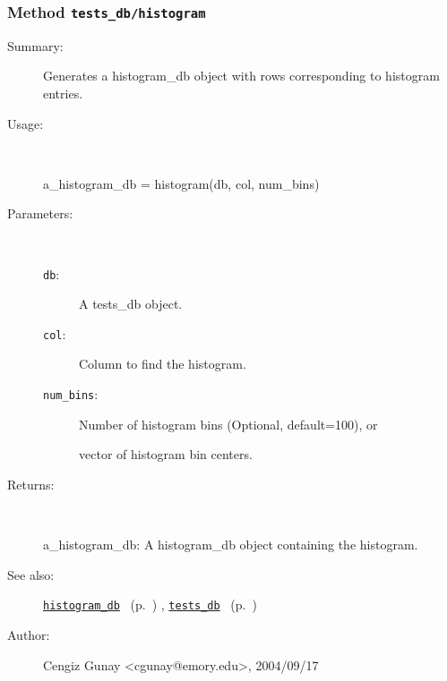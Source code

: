 \subsubsection[Method \texttt{histogram}]{Method \texttt{tests\_db/histogram}}%
%
\label{ref_tests_db__histogram}%
\hypertarget{ref_tests_db__histogram}{}%
\begin{description}
\item[Summary:]Generates a histogram\_db object with rows corresponding to 
		histogram entries.
%
\item[Usage:]~%
\begin{lyxcode}%
a\_histogram\_db = histogram(db, col, num\_bins)
%
\end{lyxcode}%
%
%
\item[Parameters:]~
\begin{description}%
\item[\texttt{db}:]
 A tests\_db object.
\item[\texttt{col}:]
 Column to find the histogram.
\item[\texttt{num\_bins}:]
 Number of histogram bins (Optional, default=100), or

vector of histogram bin centers.\end{description}%
%
\item[Returns:]~

	a\_histogram\_db: A histogram\_db object containing the histogram.
%
%
\item[See also:]%
\hyperlink{ref_histogram_db}{\texttt{histogram\_db}}%
\ (p.~\pageref{ref_histogram_db})%
%
, \hyperlink{ref_tests_db}{\texttt{tests\_db}}%
\ (p.~\pageref{ref_tests_db})%
%
%
\item[Author:]%
Cengiz Gunay <cgunay@emory.edu>, 2004/09/17%
\end{description}
\methodline%

